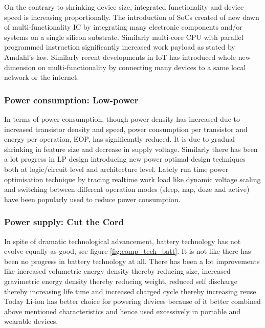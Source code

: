 \documentclass[UKenglish]{ifimaster}  %
\begin{document}
On the contrary to shrinking device size, integrated functionality and device speed is increasing proportionally. 
The introduction of SoCs created of new dawn of multi-functionality IC by integrating many electronic components 
and/or systems on a single silicon substrate. Similarly multi-core CPU with parallel programmed instruction  
significantly increased work payload as stated by Amdahl's law. Similarly recent developments in IoT has 
introduced whole new dimension on multi-functionality by connecting many devices to a same local network or 
the internet\cite{iot_intro}. \\

\subsubsection{Power consumption: Low-power}

In terms of power consumption, though power density has increased due to increased transistor density and speed, 
power consumption per transistor and energy per operation, EOP, has significantly reduced. It is due to gradual 
shrinking in feature size and decrease in supply voltage. Similarly there has been a lot progress in LP design 
introducing new power optimal design techniques both at logic/circuit level and architecture level. Lately run 
time power optimisation technique by tracing realtime work load like dynamic voltage scaling and switching 
between different operation modes (sleep, nap, doze and active) have been popularly used to reduce power 
consumption\cite{rabaey_2009}. \\


\subsubsection{Power supply: Cut the Cord}

In spite of dramatic technological advancement, battery technology has not evolve equally as good, see figure 
\ref{fig:comp_tech_batt}. It is not like there has been no progress in battery technology at all. There has been a lot improvements 
like increased volumetric energy density thereby reducing size, increased gravimetric energy density thereby 
reducing weight, reduced self discharge thereby increasing life time and increased charged cycle thereby 
increasing reuse\cite{review_energy_harvest}. Today Li-ion has better choice for powering devices because of it better combined 
above mentioned characteristics and hence used excessively in portable and wearable devices. \\
\end{document}
